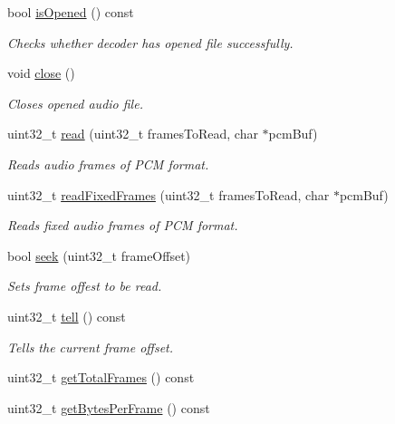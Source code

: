 \begin{DoxyCompactItemize}
bool \hyperlink{classcocos2d_1_1experimental_1_1AudioDecoder_a3989ba6f09b6f772a75d5d3255174286}{is\+Opened} () const
\begin{DoxyCompactList}\small\item\em Checks whether decoder has opened file successfully. \end{DoxyCompactList}\item 
void \hyperlink{classcocos2d_1_1experimental_1_1AudioDecoder_aa080c4ee1f7964f6660295ce325a64d5}{close} ()
\begin{DoxyCompactList}\small\item\em Closes opened audio file. \end{DoxyCompactList}\item 
uint32\+\_\+t \hyperlink{classcocos2d_1_1experimental_1_1AudioDecoder_a08e022937ab16479dc381393df1bc3d5}{read} (uint32\+\_\+t frames\+To\+Read, char $\ast$pcm\+Buf)
\begin{DoxyCompactList}\small\item\em Reads audio frames of P\+CM format. \end{DoxyCompactList}\item 
uint32\+\_\+t \hyperlink{classcocos2d_1_1experimental_1_1AudioDecoder_a55fbd14ff185cdf67fd9fe6674bde473}{read\+Fixed\+Frames} (uint32\+\_\+t frames\+To\+Read, char $\ast$pcm\+Buf)
\begin{DoxyCompactList}\small\item\em Reads fixed audio frames of P\+CM format. \end{DoxyCompactList}\item 
bool \hyperlink{classcocos2d_1_1experimental_1_1AudioDecoder_a59f8d937bf5fb9130bef774879ec60f4}{seek} (uint32\+\_\+t frame\+Offset)
\begin{DoxyCompactList}\small\item\em Sets frame offest to be read. \end{DoxyCompactList}\item 
uint32\+\_\+t \hyperlink{classcocos2d_1_1experimental_1_1AudioDecoder_a7a9f425aa4e62390e404134f19b1bdaf}{tell} () const
\begin{DoxyCompactList}\small\item\em Tells the current frame offset. \end{DoxyCompactList}\item 
uint32\+\_\+t \hyperlink{classcocos2d_1_1experimental_1_1AudioDecoder_a4b8982582b6cb6b81c49e05234c3c734}{get\+Total\+Frames} () const
\item 
uint32\+\_\+t \hyperlink{classcocos2d_1_1experimental_1_1AudioDecoder_ac445d905fc7ec67d53fc542d590322c0}{get\+Bytes\+Per\+Frame} () const

\end{DoxyCompactItemize}
